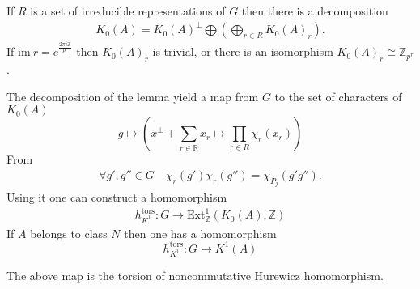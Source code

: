 \documentclass{beamer}
\theoremstyle{plain}
\newcommand{\Z}{\mathbb{Z}}                  %
\newcommand{\R}{\mathbb{R}}                  %
\newcommand{\im}{\mathrm{im}}       %
\newcommand{\Ext}{\mathrm{Ext}}       %
\newcommand{\bean}{\begin{eqnarray*}}
\newcommand{\eean}{\end{eqnarray*}}
\begin{document}
\begin{frame}
\begin{lemma}\label{h_tors_lem}
	If $R$ is a set of irreducible representations of $G$ then there is a decomposition
	\bean
	K_0\left( A\right) = K_0\left(A \right)^\perp \bigoplus  \left(\bigoplus_{r \in R} K_0 \left( A \right)_r\right).
	\eean
	If $\im ~r = e^{\frac{2\pi i \Z}{p_r}}$ then  $K_0 \left( A \right)_r$ is trivial, or there is an isomorphism $K_0 \left( A \right)_r\cong \Z_{p^r}$.
\end{lemma}


\end{frame}
\begin{frame}
The decomposition of the lemma yield a map from $G$ to the set of characters of  $K_0\left(A \right)$ 
$$
g \mapsto \left(x^\perp + \sum_{r \in \R} x_r \mapsto \prod_{r\in R}\chi_r\left(x_r \right)   \right) 
$$
From 
\bean
\forall g', g'' \in G\quad \chi_{r}\left(g' \right)\chi_{r}\left(g'' \right)= \chi_{P_j}\left(g 'g''\right).
\eean
Using it one can construct  a homomorphism 
\bean
h_{K^1}^{\mathrm{tors}} : G \to   \Ext^1_\Z\left( K_0\left( A\right), \Z \right)
\eean
If $A$ belongs to class $N$  then one has a homomorphism
$$
h_{K^1}^{\mathrm{tors}} : G\to   K^1\left(A \right) 
$$


\begin{definition}\label{hurewicz_torsion_defn}
	The above
	map is the \alert{torsion  of noncommutative Hurewicz homomorphism}.  
	\end{definition}
\end{frame}
\end{document}
